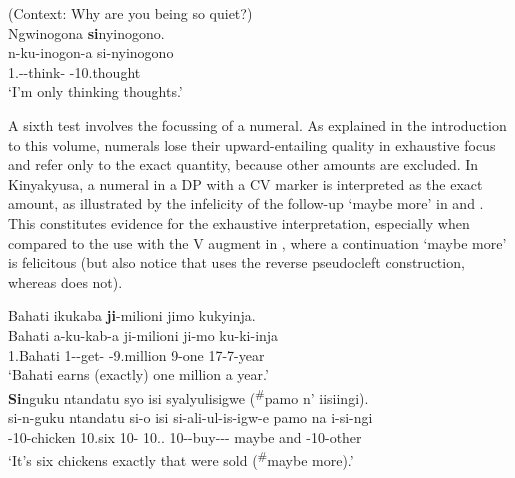 \documentclass[output=paper]{langscibook}
\begin{document}
\ex
\label{bkm:Ref114666853}
(Context: Why are you being so quiet?\label{bkm:Ref56944487})\\
Ngwinogona \textbf{si}nyinogono.\\
\gll
n-ku-inogon-a  si-nyinogono\\
1\SG.\SM{}-\PRS{}-think-\FV{}  \EXH{}-10.thought\\
\glt
‘I’m only thinking thoughts.’ \citep[339]{vanderWalLusekelo2022}\\

\z


A sixth test involves the focussing of a numeral. As explained in the introduction to this volume, numerals lose their upward-entailing quality in exhaustive focus and refer only to the exact quantity, because other amounts are excluded. In Kinyakyusa, a numeral in a DP with a CV marker is interpreted as the exact amount, as illustrated by the infelicity of the follow-up ‘maybe more’ in  and . This constitutes evidence for the exhaustive interpretation, especially when compared to the use with the V augment in , where a continuation ‘maybe more’ is felicitous (but also notice that  uses the reverse pseudocleft construction, whereas  does not).\largerpage[2.25]

\ea
\label{bkm:Ref144796821}
\label{bkm:Ref76979279}
Bahati ikukaba \textbf{ji}-milioni jimo kukyinja.\\
\gll
Bahati  a-ku-kab-a  ji-milioni  ji-mo  ku-ki-inja\\
1.Bahati  1\SM{}-\PRS{}-get-\FV{}  \EXH{}-9.million  9-one  17-7-year\\
\glt
‘Bahati earns (exactly) one million a year.’ \citep[339]{vanderWalLusekelo2022}\\


\ex
\label{bkm:Ref56945623}
\ea
\label{bkm:Ref56945623:a}
\textbf{Si}nguku ntandatu syo isi syalyulisigwe (\textsuperscript{\#}pamo n’ iisiingi).\\
\gll
si-n-guku  ntandatu  si-o  isi  si-ali-ul-is-igw-e pamo  na  i-si-ngi\\
\EXH{}-10-chicken  10.six  10-\IDCOP{}  10.\DEM{}.\PROX{}  10\SM{}-\PST{}-buy-\CAUS-\PASS{}-\PFV{} maybe  and  \AUG{}-10-other\\
\glt ‘It’s six chickens exactly that were sold (\textsuperscript{\#}maybe more).’
\end{document}
